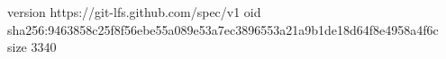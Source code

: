 version https://git-lfs.github.com/spec/v1
oid sha256:9463858c25f8f56ebe55a089e53a7ec3896553a21a9b1de18d64f8e4958a4f6c
size 3340
